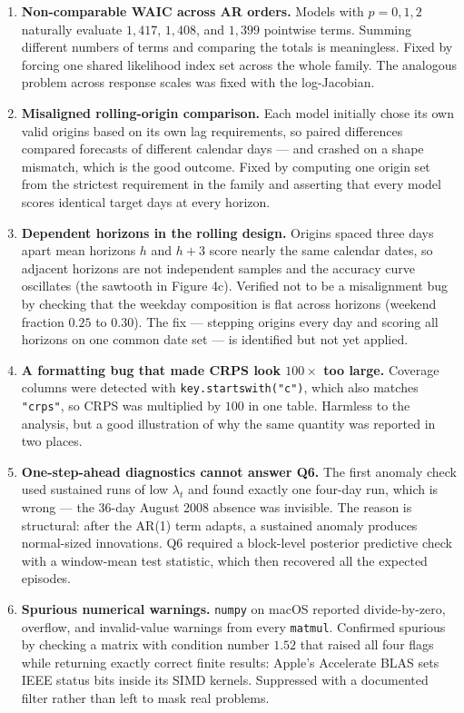 \documentclass[11pt]{article}
\newcommand{\code}[1]{\texttt{\small #1}}
\begin{document}
\begin{enumerate}[leftmargin=*,start=7]
\item \textbf{Non-comparable WAIC across AR orders.} Models with $p = 0, 1, 2$
naturally evaluate $1{,}417$, $1{,}408$, and $1{,}399$ pointwise terms. Summing
different numbers of terms and comparing the totals is meaningless. Fixed by
forcing one shared likelihood index set across the whole family. The analogous
problem across response scales was fixed with the log-Jacobian.

\item \textbf{Misaligned rolling-origin comparison.} Each model initially chose
its own valid origins based on its own lag requirements, so paired differences
compared forecasts of different calendar days --- and crashed on a shape
mismatch, which is the good outcome. Fixed by computing one origin set from the
strictest requirement in the family and asserting that every model scores
identical target days at every horizon.

\item \textbf{Dependent horizons in the rolling design.} Origins spaced three
days apart mean horizons $h$ and $h+3$ score nearly the same calendar dates, so
adjacent horizons are not independent samples and the accuracy curve oscillates
(the sawtooth in Figure 4c). Verified not to be a misalignment bug by checking
that the weekday composition is flat across horizons (weekend fraction $0.25$
to $0.30$). The fix --- stepping origins every day and scoring all horizons on
one common date set --- is identified but not yet applied.

\item \textbf{A formatting bug that made CRPS look $100\times$ too large.}
Coverage columns were detected with \code{key.startswith("c")}, which also
matches \code{"crps"}, so CRPS was multiplied by $100$ in one table. Harmless
to the analysis, but a good illustration of why the same quantity was reported
in two places.

\item \textbf{One-step-ahead diagnostics cannot answer Q6.} The first anomaly
check used sustained runs of low $\lambda_t$ and found exactly one four-day
run, which is wrong --- the 36-day August 2008 absence was invisible. The
reason is structural: after the AR(1) term adapts, a sustained anomaly produces
normal-sized innovations. Q6 required a block-level posterior predictive check
with a window-mean test statistic, which then recovered all the expected
episodes.

\item \textbf{Spurious numerical warnings.} \code{numpy} on macOS reported
divide-by-zero, overflow, and invalid-value warnings from every \code{matmul}.
Confirmed spurious by checking a matrix with condition number $1.52$ that
raised all four flags while returning exactly correct finite results: Apple's
Accelerate BLAS sets IEEE status bits inside its SIMD kernels. Suppressed with
a documented filter rather than left to mask real problems.
\end{enumerate}
\end{document}
